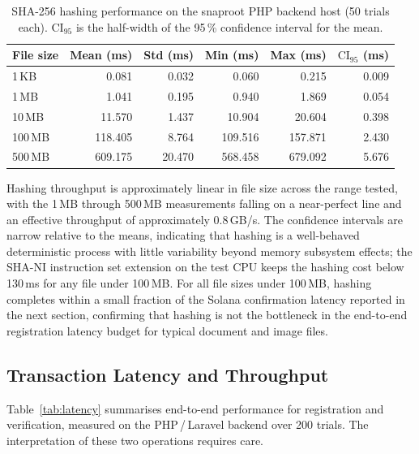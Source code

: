 \documentclass[11pt,a4paper]{article}
\begin{document}
\begin{table}[ht]
\centering
\small
\caption{SHA-256 hashing performance on the snaproot PHP backend host
(50 trials each). $\mathrm{CI}_{95}$ is the half-width of the 95\,\%
confidence interval for the mean.}
\label{tab:hashing}
\begin{tabular}{lrrrrr}
\toprule
\textbf{File size} & \textbf{Mean (ms)} & \textbf{Std (ms)} &
\textbf{Min (ms)} & \textbf{Max (ms)} & \textbf{$\mathrm{CI}_{95}$ (ms)} \\
\midrule
1\,KB    &   0.081  &  0.032  &   0.060  &   0.215  & 0.009 \\
1\,MB    &   1.041  &  0.195  &   0.940  &   1.869  & 0.054 \\
10\,MB   &  11.570  &  1.437  &  10.904  &  20.604  & 0.398 \\
100\,MB  & 118.405  &  8.764  & 109.516  & 157.871  & 2.430 \\
500\,MB  & 609.175  & 20.470  & 568.458  & 679.092  & 5.676 \\
\bottomrule
\end{tabular}
\end{table}

Hashing throughput is approximately linear in file size across the
range tested, with the 1\,MB through 500\,MB measurements falling on a
near-perfect line and an effective throughput of approximately
0.8\,GB/s. The confidence intervals are narrow relative to the means,
indicating that hashing is a well-behaved deterministic process with
little variability beyond memory subsystem effects; the SHA-NI
instruction set extension on the test CPU keeps the hashing cost below
130\,ms for any file under 100\,MB. For all file sizes under 100\,MB,
hashing completes within a small fraction of the Solana confirmation
latency reported in the next section, confirming that hashing is not
the bottleneck in the end-to-end registration latency budget for
typical document and image files.

\subsection{Transaction Latency and Throughput}
\label{sec:evaluation:latency}

Table~\ref{tab:latency} summarises end-to-end performance for
registration and verification, measured on the PHP\,/\,Laravel backend
over 200 trials. The interpretation of these two operations requires
care.
\end{document}
